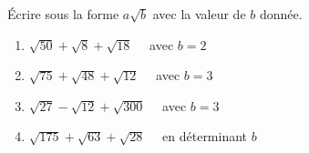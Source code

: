 \begin{exo}{}
	Écrire sous la forme $a\sqrt{b}$ avec la valeur de $b$ donnée.
	\begin{enumerate}[itemsep=2mm]
		\item $\sqrt{50} + \sqrt{8} + \sqrt{18}\quad$ avec $b = 2$
		\item $\sqrt{75} + \sqrt{48} + \sqrt{12}\quad$ avec $b = 3$
		\item $\sqrt{27} - \sqrt{12} + \sqrt{300}\quad$ avec $b = 3$
		\item $\sqrt{175} + \sqrt{63} + \sqrt{28}\quad$ en déterminant $b$
	\end{enumerate}
\end{exo}
